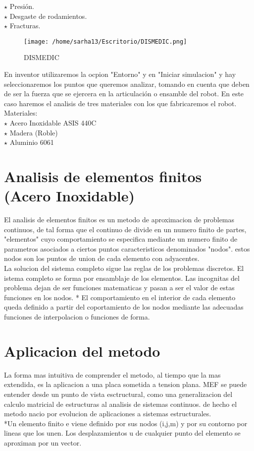 \documentclass[letter,openright,12pt,spanish]{report}
\begin{document}
$\star$ Presi\'on.\\

$\star$ Desgaste de rodamientos.\\

$\star$ Fracturas.\\

\begin{figure}[htp]
\centering
\texttt{[image: /home/sarha13/Escritorio/DISMEDIC.png]}
\caption{DISMEDIC}
\label{Figura 1}
\end{figure}

En inventor utilizaremos la ocpion "Entorno" y en "Iniciar simulacion" y hay seleccionaremos los puntos que queremos analizar, tomando en cuenta que deben de ser la fuerza que se ejercera en la articulaci\'on o ensamble del robot. En este caso haremos el analisis de tres materiales con los que fabricaremos el robot.\\

Materiales: \\

$\star$ Acero Inoxidable ASIS 440C\\

$\star$ Madera (Roble)\\

$\star$ Aluminio 6061

\section{Analisis de elementos finitos (Acero Inoxidable)}
El analisis de elementos finitos es un metodo de aproximacion de problemas continuos, de tal forma que el continuo de divide en un numero finito de partes, "elementos" cuyo comportamiento se especifica mediante un numero finito de parametros asociados a ciertos puntos caracteristicos denominados "nodos". estos nodos son los puntos de union de cada elemento con adyacentes.\\
La solucion del sistema completo sigue las reglas de los problemas discretos. El istema completo se forma por ensamblaje de los elementos. Las incognitas del problema dejan de ser funciones matematicas y pasan a ser el valor de estas funciones en los nodos.
* El comportamiento en el interior de cada elemento queda definido a partir del coportamiento de los nodos mediante las adecuadas funciones de interpolacion o funciones de forma.

\section{Aplicacion del metodo}
La forma mas intuitiva de comprender el metodo, al tiempo que la mas extendida, es la aplicacion a una placa sometida a tension plana. MEF se puede entender desde un punto de vista esctructural, como una generalizacion del calculo matricial de estructuras al analisis de sistemas continuos. de hecho el metodo nacio por evolucion de aplicaciones a sistemas estructurales.\\
*Un elemento finito e viene definido por sus nodos (i,j,m) y por su contorno por lineas que los unen. Los desplazamientos u de cualquier punto del elemento se aproximan por un vector.
\end{document}
